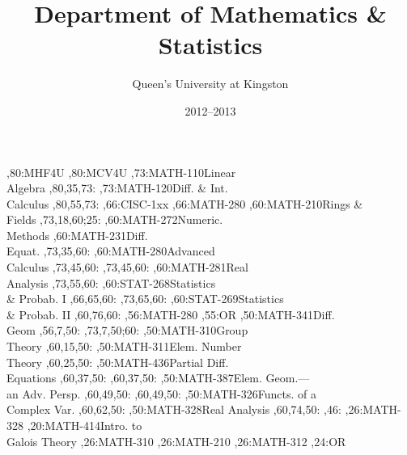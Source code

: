 \documentclass[9pt]{extarticle}
\begin{document}
\title{Department of Mathematics \& Statistics}
\author{Queen's University at Kingston}
\date{2012--2013}
\maketitle
\thispagestyle{empty}
\begin{chart}
,80:{MHF4U}
,80:{MCV4U}
,73:{MATH-110}{Linear\\Algebra}{}
  ,80,35,73:
,73:{MATH-120}{Diff. \& Int.\\Calculus}{}
  ,80,55,73:
,66:{CISC-1xx}
,66:{MATH-280}
,60:{MATH-210}{Rings \&\\Fields}{}
  ,73,18,60;25:
,60:{MATH-272}{Numeric.\\Methods}{}
,60:{MATH-231}{Diff.\\Equat.}{}
  ,73,35,60:
,60:{MATH-280}{Advanced\\Calculus}{}
  ,73,45,60:
  ,73,45,60:
,60:{MATH-281}{Real\\Analysis}{}
  ,73,55,60:
,60:{STAT-268}{Statistics\\\& Probab. I}{}
  ,66,65,60:
  ,73,65,60:
,60:{STAT-269}{Statistics\\\& Probab. II}{}
  ,60,76,60:
,56:{MATH-280}
,55:{OR}
,50:{MATH-341}{Diff.\\Geom}{}
  ,56,7,50:
  ,73,7,50;60:
,50:{MATH-310}{Group\\Theory}{}
  ,60,15,50:
,50:{MATH-311}{Elem. Number\\Theory}{}
  ,60,25,50:
,50:{MATH-436}{Partial Diff.\\Equations}{}
  ,60,37,50:
  ,60,37,50:
,50:{MATH-387}{Elem. Geom.---\\an Adv. Persp.}{}
  ,60,49,50:
  ,60,49,50:
,50:{MATH-326}{Functs. of a\\Complex Var.}{}
  ,60,62,50:
,50:{MATH-328}{Real Analysis}{}
  ,60,74,50:
,46:{}
,26:{MATH-328}
,20:{MATH-414}{Intro. to\\Galois Theory}{}
,26:{MATH-310}
,26:{MATH-210}
,26:{MATH-312}
,24:{OR}

\end{chart}
\end{document}
